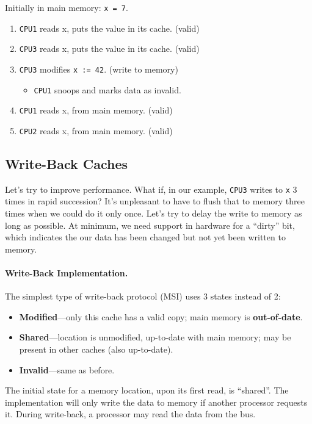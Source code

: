 \documentclass[a4paper]{report}
\begin{document}
Initially in main memory: {\tt x = 7}.

  \begin{enumerate}
    \item {\tt CPU1} reads x, puts the value in its cache. {(valid)}
    \item {\tt CPU3} reads x, puts the value in its cache. {(valid)}
    \item {\tt CPU3} modifies {\tt x := 42}. {(write to memory)}
      \begin{itemize}
        \item {{\tt CPU1} snoops and marks data as invalid.}
      \end{itemize}
    \item {\tt CPU1} reads x, {from main memory. (valid)}
    \item {\tt CPU2} reads x, {from main memory. (valid)}
  \end{enumerate}

\subsection*{Write-Back Caches}
Let's try to improve performance. What if, in our example, {\tt CPU3} writes to {\tt x} 3 times in rapid succession? It's unpleasant to have to flush that to memory three times when we could do it only once. Let's try to delay the write to memory as long as possible. At minimum, we need support in hardware for a ``dirty'' bit, which indicates the our data has been changed but not yet been written to memory.

\paragraph{Write-Back Implementation.}
     The simplest type of write-back protocol (MSI) uses 3 states instead of 2:
      \begin{itemize}
        \item {\bf Modified}---only this cache has a valid copy; 
          main memory is {\bf out-of-date}.
        \item {\bf Shared}---location is unmodified, 
           up-to-date with main
          memory; 
          \quad may be present in other caches (also up-to-date).
        \item {\bf Invalid}---same as before.
      \end{itemize}
      
The initial state for a memory location, upon its first read, is ``shared''.
The implementation will only write the data to memory if another
processor requests it.
During write-back, a processor may read the data from the bus.
\end{document}
